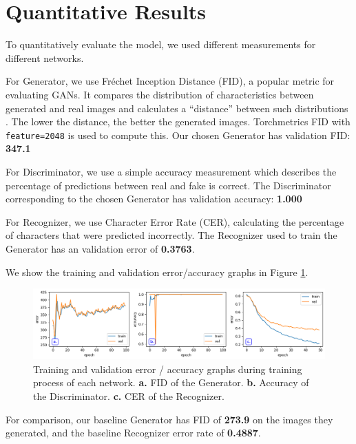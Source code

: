 \documentclass{article} %
\begin{document}
\section{Quantitative Results}
\label{section:quantitative_results}
To quantitatively evaluate the model, we used different measurements for different networks.

For Generator, we use Fréchet Inception Distance (FID), a popular metric for evaluating GANs. It compares the distribution of characteristics between generated and real images and calculates a ``distance'' between such distributions \citep{FID_paper}. The lower the distance, the better the generated images. Torchmetrics FID with \texttt{feature=2048} is used to compute this. Our chosen Generator has validation FID: \textbf{347.1}

For Discriminator, we use a simple accuracy measurement which describes the percentage of predictions between real and fake is correct. The Discriminator corresponding to the chosen Generator has validation accuracy: \textbf{1.000}

For Recognizer, we use Character Error Rate (CER), calculating the percentage of characters that were predicted incorrectly. The Recognizer used to train the Generator has an validation error of \textbf{0.3763}.

We show the training and validation error/accuracy graphs in Figure \ref{fig:training_graphs}.

\begin{figure}[!hbpt]
    \begin{center}
        \includegraphics[width=\textwidth]{Figs/training-graphs.png}
    \end{center}
    \caption{Training and validation error / accuracy graphs during training process of each network. \textbf{a.} FID of the Generator. \textbf{b.} Accuracy of the Discriminator. \textbf{c.} CER of the Recognizer.}
    \label{fig:training_graphs}
\end{figure}

For comparison, our baseline Generator has FID of \textbf{273.9} on the images they generated, and the baseline Recognizer error rate of \textbf{0.4887}.
\end{document}
